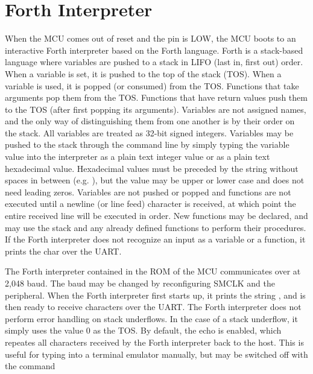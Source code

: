 \documentclass[11pt,pdftex,portrait,letterpaper]{article}
\begin{document}
\newpage
	



\section{Forth Interpreter} \label{s:forth}
When the MCU comes out of reset and the  pin is LOW, the MCU boots to an interactive Forth interpreter based on the Forth language. Forth is a stack-based language where variables are pushed to a stack in LIFO (last in, first out) order. When a variable is set, it is pushed to the top of the stack (TOS). When a variable is used, it is popped (or consumed) from the TOS. Functions that take arguments pop them from the TOS. Functions that have return values push them to the TOS (after first popping its arguments). Variables are not assigned names, and the only way of distinguishing them from one another is by their order on the stack. All variables are treated as 32-bit signed integers. Variables may be pushed to the stack through the command line by simply typing the variable value into the interpreter as a plain text integer value or as a plain text hexadecimal value. Hexadecimal values must be preceded by the string  without spaces in between (e.g. ), but the value may be upper or lower case and does not need leading zeros. Variables are not pushed or popped and functions are not executed until a newline (or line feed) \forthinlinehl{\\n} character is received, at which point the entire received line will be executed in order. New functions may be declared, and may use the stack and any already defined functions to perform their procedures. If the Forth interpreter does not recognize an input as a variable or a function, it prints the  char over the UART.

The Forth interpreter contained in the ROM of the MCU communicates over  at 2,048 baud. The baud may be changed by reconfiguring SMCLK and the  peripheral. When the Forth interpreter first starts up, it prints the string , and is then ready to receive characters over the UART. The Forth interpreter does not perform error handling on stack underflows. In the case of a stack underflow, it simply uses the value 0 as the TOS. By default, the echo is enabled, which repeates all characters received by the Forth interpreter back to the host. This is useful for typing into a terminal emulator manually, but may be switched off with the command 
\end{document}

